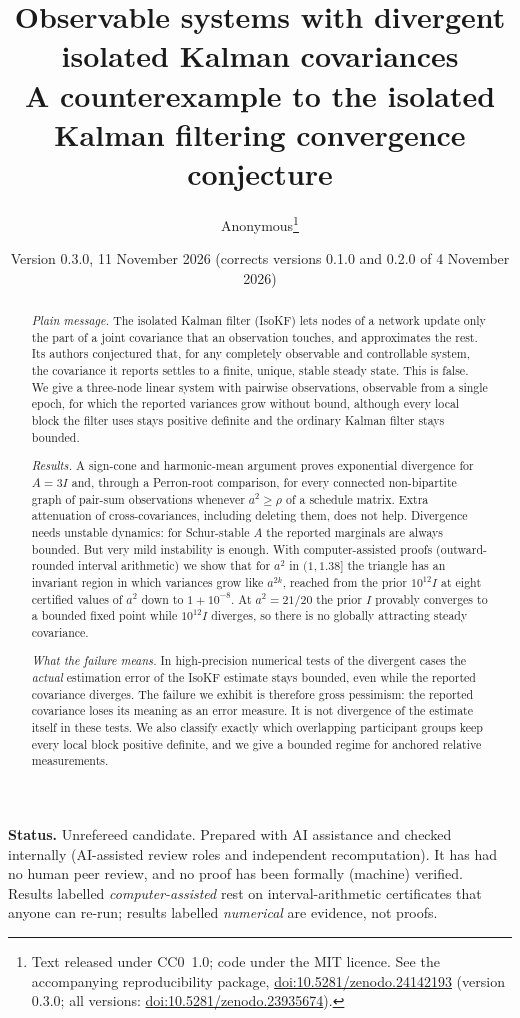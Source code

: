 \documentclass[11pt,a4paper]{article}
\title{\textbf{Observable systems with divergent isolated Kalman covariances}\\[6pt]
 \large A counterexample to the isolated Kalman filtering convergence conjecture}
\author{Anonymous\thanks{Text released under CC0~1.0; code under the MIT licence.
 See the accompanying reproducibility package,
 \href{https://doi.org/10.5281/zenodo.24142193}{doi:10.5281/zenodo.24142193} (version 0.3.0;
 all versions: \href{https://doi.org/10.5281/zenodo.23935674}{doi:10.5281/zenodo.23935674}).}}
\date{Version 0.3.0, 11 November 2026 (corrects versions 0.1.0 and 0.2.0 of 4 November 2026)}
\numberwithin{equation}{section}
\theoremstyle{remark}\newtheorem{remark}[theorem]{Remark}
\begin{document}
\maketitle

\noindent\textbf{Status.} Unrefereed candidate. Prepared with AI assistance and checked
internally (AI-assisted review roles and independent recomputation). It has had no human peer
review, and no proof has been formally (machine) verified. Results labelled
\emph{computer-assisted} rest on interval-arithmetic certificates that anyone can re-run;
results labelled \emph{numerical} are evidence, not proofs.

\begin{abstract}
\emph{Plain message.} The isolated Kalman filter (IsoKF) lets nodes of a network update only the
part of a joint covariance that an observation touches, and approximates the rest. Its
authors conjectured that, for any completely observable and controllable system, the
covariance it reports settles to a finite, unique, stable steady state. This is false. We give
a three-node linear system with pairwise observations, observable from a single epoch, for
which the reported variances grow without bound, although every local block the filter uses
stays positive definite and the ordinary Kalman filter stays bounded.

\emph{Results.} A sign-cone and harmonic-mean argument proves exponential divergence for
$A=3I$ and, through a Perron-root comparison, for every connected non-bipartite graph of
pair-sum observations whenever $a^2\ge\rho$ of a schedule matrix. Extra attenuation of
cross-covariances, including deleting them, does not help. Divergence needs unstable
dynamics: for Schur-stable $A$ the reported marginals are always bounded. But very mild
instability is enough. With computer-assisted proofs (outward-rounded interval arithmetic) we
show that for $a^2$ in $(1,1.38]$ the triangle has an invariant region in which variances grow
like $a^{2k}$, reached from the prior $10^{12}I$ at eight certified values of $a^2$ down to
$1+10^{-8}$. At $a^2=21/20$ the prior $I$ provably converges to a bounded fixed point while
$10^{12}I$ diverges, so there is no globally attracting steady covariance.

\emph{What the failure means.} In high-precision numerical tests of the divergent cases the \emph{actual} estimation
error of the IsoKF estimate stays bounded, even while the reported covariance diverges. The
failure we exhibit is therefore gross pessimism: the reported covariance loses its meaning as
an error measure. It is not divergence of the estimate itself in these tests. We also classify
exactly which overlapping participant groups keep every local block positive definite, and
we give a bounded regime for anchored relative measurements.
\end{abstract}
\end{document}
